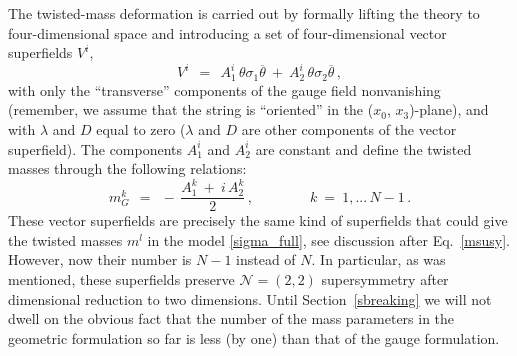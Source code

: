 \documentclass[12pt]{article}
\newcommand{\ntwot}{${\mathcal N}= \left(2,2\right) $ }
\newcommand{\ov}{\overline}
\begin{document}
	The twisted-mass deformation is carried out by formally lifting the theory to  four-dimensional space and introducing a set of
four-dimensional vector superfields $ V^i $,
\begin{equation}
%
\label{Vi}
	V^i ~~=~~ A_1^i\, \theta\sigma_1\ov{\theta} ~+~ A_2^i\, \theta\sigma_2\ov{\theta}\,,
\end{equation}
	with only the ``transverse'' components of the gauge field nonvanishing 
	(remember, we assume that the string is ``oriented'' in the ($x_0$, $x_3$)-plane), and with $ \lambda $ and $ D $ equal to zero ($ \lambda $ and $ D $ are other components of the vector superfield).
	The  components $A_1^i$ and $A_2^i$ are constant and define the twisted masses
	through the following relations:
\begin{equation}
\label{mGi}
	m_G^k ~~=~~ -\, \frac{A_1^k ~+~ i\, A_2^k}{2}\,,
	\qquad\qquad k ~=~ 1, ...\, N-1\,.
\end{equation}
	These vector superfields are precisely the same kind of superfields that could give the twisted masses $m^l$
in the model \eqref{sigma_full},
	see discussion after Eq.~\eqref{msusy}. However,  now their number   is $ N - 1 $ instead of $ N $.
	In particular, as was mentioned, these superfields preserve \ntwot supersymmetry
	after dimensional reduction to two dimensions.
	Until Section~\ref{sbreaking} we will not  dwell on the obvious fact that the number of the
	mass parameters in the geometric formulation so far is less (by one) than that of the gauge formulation.
	
\end{document}
